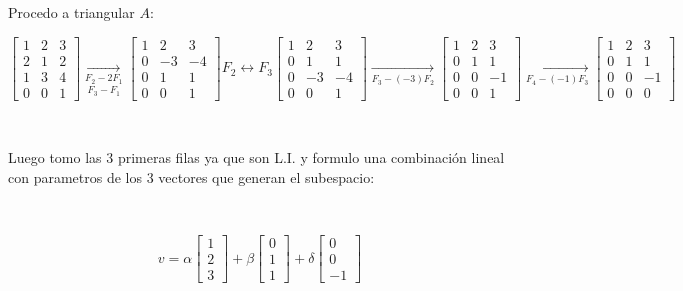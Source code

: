 \documentclass{article}
\begin{document}
\noindent Procedo a triangular $A$:

\[\begin{bmatrix}
    1 & 2 & 3 \\
    2 & 1 & 2 \\
    1 & 3 & 4 \\
    0 & 0 & 1
\end{bmatrix}
\underset{F_3-F_1}{\underset{F_2 - 2F_1}{\rightarrow}}
\begin{bmatrix}
    1 & 2 & 3 \\
    0 & -3 & -4 \\
    0 & 1 & 1 \\
    0 & 0 & 1
\end{bmatrix}
F_2 \leftrightarrow F_3
\begin{bmatrix}
    1 & 2 & 3 \\
    0 & 1 & 1 \\
    0 & -3 & -4 \\
    0 & 0 & 1
\end{bmatrix}
\underset{F_3 - (-3)F_2}{\rightarrow}
\begin{bmatrix}
    1 & 2 & 3 \\
    0 & 1 & 1 \\
    0 & 0 & -1 \\
    0 & 0 & 1
\end{bmatrix}
\underset{F_4 - (-1)F_3}{\rightarrow}
\begin{bmatrix}
    1 & 2 & 3 \\
    0 & 1 & 1 \\
    0 & 0 & -1 \\
    0 & 0 & 0
\end{bmatrix}
\]

\

\noindent Luego tomo las 3 primeras filas ya que son L.I. y formulo una combinación lineal con parametros 
de los 3 vectores que generan el subespacio:

\

\[v =  
\alpha\begin{bmatrix}
    1 \\
    2 \\
    3
\end{bmatrix}
+
\beta\begin{bmatrix}
    0 \\ 
    1 \\
    1
\end{bmatrix}
+
\delta\begin{bmatrix}
    0 \\
    0 \\
    -1
\end{bmatrix}
\]
\end{document}
